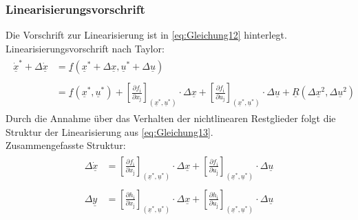 \subsubsection{Linearisierungsvorschrift}
\label{sec:Linearisierungsvorschrift}
Die Vorschrift zur Linearisierung ist in \autoref{eq:Gleichung12} hinterlegt.\\
\newline
Linearisierungsvorschrift nach Taylor:
\begin{align}
    \begin{split}
        \dot{\underline{x}}^{*}+\Delta{\dot{\underline{x}}} &=\underline{f}(\underline{x}^{*}+\Delta{\underline{x}},\underline{u}^{*}+\Delta{\underline{u}})\\\\
        &=\underline{f}(\underline{x}^{*},\underline{u}^{*})+\left[\frac{\partial f_{\mathrm{i}}}{\partial x_{\mathrm{j}}}\right]_{(\underline{x}^{*}, \underline{u}^{*})}\cdot\Delta{\underline{x}}+\left[\frac{\partial f_{\mathrm{i}}}{\partial u_{\mathrm{j}}}\right]_{(\underline{x}^{*},\underline{u}^{*})}\cdot\Delta{\underline{u}}+\underline{R}(\Delta{\underline{x}^2}, \Delta{\underline{u}^2})
    \end{split}
    \label{eq:Gleichung12}
\end{align}
\newline
Durch die Annahme über das Verhalten der nichtlinearen Restglieder folgt die Struktur der Linearisierung aus \autoref{eq:Gleichung13}.\\
\newline
Zusammengefasste Struktur:
\begin{align}
    \begin{split}
        \Delta\dot{\underline{x}} &= \left[\frac{\partial f_{\mathrm{i}}}{\partial x_{\mathrm{j}}}\right]_{(\underline{x}^{*}, \underline{u}^{*})}\cdot\Delta{\underline{x}}+\left[\frac{\partial f_{\mathrm{i}}}{\partial u_{\mathrm{j}}}\right]_{(\underline{x}^{*},\underline{u}^{*})}\cdot\Delta{\underline{u}}\\\\
        \Delta{\underline{y}} &= \left[\frac{\partial h_{\mathrm{i}}}{\partial x_{\mathrm{j}}}\right]_{(\underline{x}^{*}, \underline{u}^{*})}\cdot\Delta{\underline{x}}+\left[\frac{\partial h_{\mathrm{i}}}{\partial u_{\mathrm{j}}}\right]_{(\underline{x}^{*},\underline{u}^{*})}\cdot\Delta{\underline{u}}
    \end{split}
    \label{eq:Gleichung13}
\end{align}

